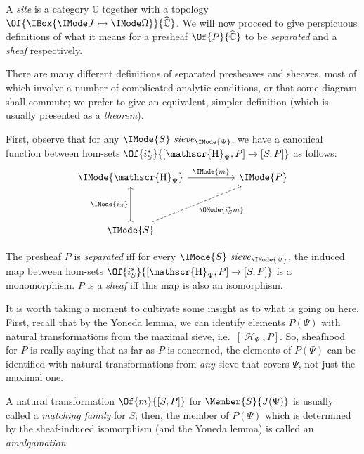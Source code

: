 \documentclass{article}
\DeclareMathOperator\OpYoneda{\mathscr{H}}
\newcommand\Yoneda[1]{\OpYoneda_{#1}}
\newcommand\Psh[1]{\widehat{#1}}
\newcommand\IsSieve[2]{\IMode{#2}\ \mathit{sieve}_{\IMode{#1}}}
\begin{document}
A \emph{site} is a category $\mathbb{C}$ together with a topology
$\Of{\IBox{\IsMono{J}{\Omega}}}{\Psh{\mathbb{C}}}$. We will now
proceed to give perspicuous definitions of what it means for a
presheaf $\Of{P}{\Psh{\mathbb{C}}}$ to be \emph{separated} and a
\emph{sheaf} respectively.

There are many different definitions of separated presheaves and
sheaves, most of which involve a number of complicated analytic
conditions, or that some diagram shall commute; we prefer to give an
equivalent, simpler definition (which is usually presented as a
\emph{theorem}).

First, observe that for any $\IsSieve{\Psi}{S}$, we have a canonical
function between hom-sets
$\Of{i_S^*}{[\Yoneda{\Psi},P]\to [S,P]}$
as follows:
\[
  \begin{tikzcd}[sep=huge]
    \IMode{\Yoneda{\Psi}}
    \arrow[r, "\IMode{m}"]
    &
    \IMode{P}
    \\
    \IMode{S}
    \arrow[u,rightarrowtail,"\IMode{i_S}"]
    \arrow[ur,swap,dashed,"\OMode{i_S^*m}"]
  \end{tikzcd}
\]

\begin{definition}
  The presheaf $P$ is \emph{separated} iff for every
  $\IsSieve{\Psi}{S}$, the induced map between hom-sets
  $\Of{i_S^*}{[\Yoneda{\Psi},P]\to[S,P]}$ is a monomorphism. $P$ is a
  \emph{sheaf} iff this map is also an isomorphism.
\end{definition}

It is worth taking a moment to cultivate some insight as to what is
going on here. First, recall that by the Yoneda lemma, we can identify
elements $P(\Psi)$ with natural transformations from the maximal
sieve, i.e.\ $[\Yoneda{\Psi},P]$. So, sheafhood for $P$ is really
saying that as far as $P$ is concerned, the elements of $P(\Psi)$ can
be identified with natural transformations from \emph{any} sieve that
covers $\Psi$, not just the maximal one.

\begin{definition}
  A natural transformation $\Of{m}{[S,P]}$ for $\Member{S}{J(\Psi)}$
  is usually called a \emph{matching family} for $S$; then, the member
  of $P(\Psi)$ which is determined by the sheaf-induced isomorphism
  (and the Yoneda lemma) is called an \emph{amalgamation}.
\end{definition}

\newcommand\ObjNom{\mathbf{nom}}
\newcommand\CatI{\mathbb{I}}
\end{document}

